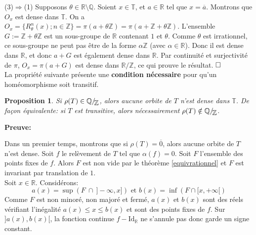 \documentclass[11pt,a4 paper]{article}
\newtheorem{propriete}[theoreme]{Proposition}
\newcommand{\Tbb}{\mathbb{T}}
\newcommand*{\EnsembleQuotient}[2]%
{\ensuremath{%
		#1/\!\raisebox{-.65ex}{\ensuremath{\mathcal{#2}}}}}
\newenvironment{ppt}{\begin{box_ppt}\begin{propriete}}{\end{propriete}\end{box_ppt}}
\begin{document}
	\par(3)$\Rightarrow$(1) Supposons $\theta \in \mathbb{R} \setminus \mathbb{Q}$. Soient $x\in \Tbb$, et $a \in \mathbb{R}$ tel que $x = \overline{a}$. Montrons que $O_x$ est dense dans $\Tbb$. On a $O_x=\lbrace R_{\theta}^n(x); n \in \mathbb{Z} \rbrace = \pi ( a + \theta \mathbb{Z} )=\pi ( a + \mathbb{Z} + \theta \mathbb{Z} )$. L'ensemble $G := \mathbb{Z} + \theta \mathbb{Z}$ est un sous-groupe de $\mathbb{R}$  contenant $1$ et $\theta$. Comme $\theta$ est irrationnel, ce sous-groupe ne peut pas être de la forme $\alpha \mathbb{Z}$ (avec $\alpha \in \mathbb{R}$). Donc il est dense dans $\mathbb{R}$, et donc $a+G$ est également dense dans $\mathbb{R}$. Par continuité et surjectivité de $\pi$, $O_x = \pi(a+G)$ est dense dans $\mathbb{R} / \mathbb{Z}$, ce qui prouve le résultat. $\hfill \square$\\


	

La propriété suivante présente une \textbf{condition nécessaire} pour qu'un homéomorphisme soit transitif.\\
	
	
	
	
	
	
	
	
\begin{ppt}\label{trans et nb rotation ratio}
	Si $\rho(T) \in \EnsembleQuotient{\mathbb{Q}}{\mathbb{Z}}$, alors aucune orbite de $T$ n'est dense dans $\Tbb$. De façon équivalente: si $T$ est transitive, alors nécessairement $\rho(T) \notin \EnsembleQuotient{\mathbb{Q}}{\mathbb{Z}}$.
\end{ppt}


\textbf{Preuve:}
	\par Dans un premier temps, montrons que si $\rho(T)= \overline{0}$, alors aucune orbite de $T$ n'est dense. Soit $f$ le relèvement de $T$ tel que $\alpha(f)=0$. Soit $F$ l'ensemble des points fixes de $f$. Alors $F$ est non vide par le théorème \ref{equivrationnel} et $F$ est invariant par translation de $1$.\\
	Soit $x \in \mathbb{R}$. Considérons:
	$$a(x)=\sup (F\ \cap \ ]-\infty,x]) \text{ et } b(x)=\inf(F \cap [x,+\infty[)$$
	Comme $F$ est non minoré, non majoré et fermé, $a(x)$ et $b(x)$ sont des réels vérifiant l'inégalité $a(x)\leq x\leq b(x)$ et sont des points fixes de $f$. Sur $]a(x),b(x)[$,  la fonction continue $f - \mathrm{Id_{\mathbb{R}}}$ ne s'annule pas donc garde un signe constant.\\
	
\end{document}
